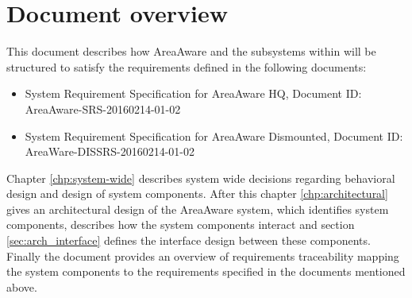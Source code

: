 \section{Document overview}
This document describes how AreaAware and the subsystems within will be structured to satisfy the requirements defined in the following documents:
\begin{itemize}
    \item System Requirement Specification for AreaAware HQ, Document ID: AreaAware-SRS-20160214-01-02
    \item System Requirement Specification for AreaAware Dismounted, Document ID: AreaWare-DISSRS-20160214-01-02
\end{itemize}

Chapter \ref{chp:system-wide} describes system wide decisions regarding behavioral design and design of system components.
After this chapter \ref{chp:architectural} gives an architectural design of the AreaAware system, which identifies system components, describes how the system components interact and section \ref{sec:arch_interface} defines the interface design between these components. \\
Finally the document provides an overview of requirements traceability mapping the system components to the requirements specified in the documents mentioned above.
